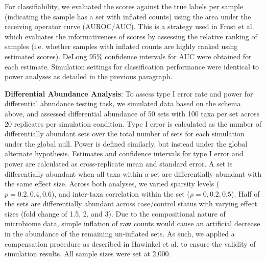\documentclass{article}
\begin{document}
For classifiability, we evaluated the scores against the true labels per sample (indicating the sample has a set with inflated counts) using the area under the receiving operator curve (AUROC/AUC). This is a strategy used in Frost et al. \cite{frost2020a} which evaluates the informativeness of scores by assessing the relative ranking of samples (i.e. whether samples with inflated counts are highly ranked using estimated scores).  DeLong 95\% confidence intervals for AUC \cite{delong1988} were obtained for each estimate. Simulation settings for classification performance were identical to power analyses as detailed in the previous paragraph. 

\noindent \textbf{Differential Abundance Analysis}: To assess type I error rate and power for differential abundance testing task, we simulated data based on the schema above, and assessed differential abundance of 50 sets with 100 taxa per set across 20 replicates per simulation condition. Type I error is calculated as the number of differentially abundant sets over the total number of sets for each simulation under the global null. Power is defined similarly, but instead under the global alternate hypothesis. Estimates and confidence intervals for type I error and power are calculated as cross-replicate mean and standard error. A set is differentially abundant when all taxa within a set are differentially abundant with the same effect size. Across both analyses, we varied sparsity levels ($p = 0.2, 0.4, 0.6$), and inter-taxa correlation within the set ($\rho = 0, 0.2, 0.5$). Half of the sets are differentially abundant across case/control status with varying effect sizes (fold change of 1.5, 2, and 3). Due to the compositional nature of microbiome data, simple inflation of raw counts would cause an artificial decrease in the abundance of the remaining un-inflated sets. As such, we applied a compensation procedure as described in Hawinkel et al. \cite{hawinkel2019} to ensure the validity of simulation results. All sample sizes were set at 2,000.    
\end{document}
